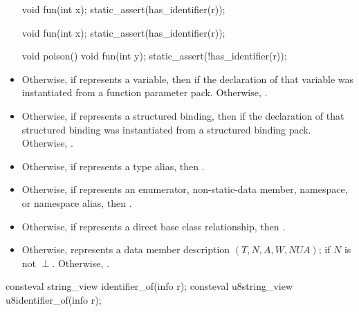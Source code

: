 \begin{itemdescr}
\begin{itemize}
\begin{example}
\begin{codeblock}
void fun(int x);
static_assert(has_identifier(r));

void fun(int x);
static_assert(has_identifier(r));

void poison() {
  void fun(int y);
}
static_assert(!has_identifier(r));
\end{codeblock}
  \end{example}
\item
  Otherwise, if  represents a variable,
  then  if the declaration of that variable
  was instantiated from a function parameter pack.
  Otherwise, .
\item
  Otherwise, if  represents a structured binding,
  then  if the declaration of that structured binding
  was instantiated from a structured binding pack.
  Otherwise, .
\item
  Otherwise, if  represents a type alias,
  then .
\item
  Otherwise, if  represents an
  enumerator,
  non-static-data member,
  namespace, or
  namespace alias,
  then .
\item
  Otherwise, if  represents a direct base class relationship,
  then .
\item
  Otherwise,  represents a data member description
  $(T, N, A, W, \mathit{NUA})$;
   if $N$ is not $\perp$.
  Otherwise, .
\end{itemize}
\end{itemdescr}

%
%
\begin{itemdecl}
consteval string_view identifier_of(info r);
consteval u8string_view u8identifier_of(info r);
\end{itemdecl}

